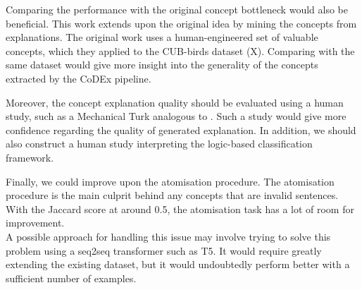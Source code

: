 Comparing the performance with the original concept bottleneck \cite{RefWorks:RefID:35-koh2020concept} would also be beneficial.
This work extends upon the original idea by mining the concepts from explanations.
The original work uses a human-engineered set of valuable concepts, which they applied to the CUB-birds dataset (X).
Comparing with the same dataset would give more insight into the generality of the concepts extracted by the CoDEx pipeline.


Moreover, the concept explanation quality should be evaluated using a human study, such as a Mechanical Turk analogous to \cite{RefWorks:RefID:16-2021automatic}.
Such a study would give more confidence regarding the quality of generated explanation.
In addition, we should also construct a human study interpreting the logic-based classification framework.

Finally, we could improve upon the atomisation procedure.
The atomisation procedure is the main culprit behind any concepts that are invalid sentences.
With the Jaccard score at around 0.5, the atomisation task has a lot of room for improvement. \\
A possible approach for handling this issue may involve trying to solve this problem using a seq2seq transformer such as T5.
It would require greatly extending the existing dataset, but it would undoubtedly perform better with a sufficient number of examples.
